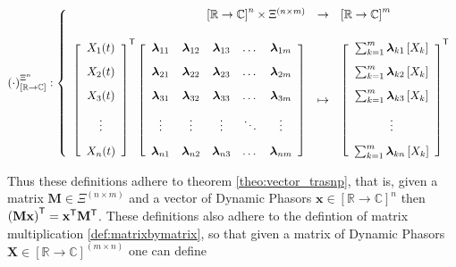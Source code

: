 \begin{equation} %
\left(\cdot\right)^{\Xi^n}_{\left[\mathbb{R}\to\mathbb{C}\right]}:
%
\left\{\begin{array}{rcl}
	\left[\mathbb{R}\to\mathbb{C}\right]^n \times \Xi^{\left(n\times m\right)} &\to& \left[\mathbb{R}\to\mathbb{C}\right]^m \\[5mm]
%
\left[\begin{array}{c} X_1(t) \\[3mm] X_2(t) \\[3mm] X_3(t) \\[3mm] \vdots \\[3mm] X_n(t) \end{array}\right]^\transpose 
\left[\begin{array}{ccccc} 
	\dpL_{11} & \dpL_{12} & \dpL_{13} & \dots  & \dpL_{1m} \\[3mm]
	\dpL_{21} & \dpL_{22} & \dpL_{23} & \dots  & \dpL_{2m} \\[3mm]
	\dpL_{31} & \dpL_{32} & \dpL_{33} & \dots  & \dpL_{3m} \\[3mm]
	\vdots    & \vdots    & \vdots    & \ddots & \vdots    \\[3mm]
	\dpL_{n1} & \dpL_{n2} & \dpL_{n3} & \dots  & \dpL_{nm}
\end{array}\right]& \mapsto &
%
\left[\begin{array}{c}
\sum_{k=1}^m \dpL_{k1}\left[X_k\right] \\[3mm]
\sum_{k=1}^m \dpL_{k2}\left[X_k\right] \\[3mm]
\sum_{k=1}^m \dpL_{k3}\left[X_k\right] \\[3mm]
\vdots                                 \\[3mm]
\sum_{k=1}^m \dpL_{kn}\left[X_k\right]
\end{array}\right]^\transpose
\end{array}\right. \label{eq:dpvec_by_matrix_def}
\end{equation} %

	Thus these definitions adhere to theorem \ref{theo:vector_trasnp}, that is, given a matrix $\mathbf{M}\in\Xi^{(n\times m)}$ and a vector of Dynamic Phasors $\mathbf{x}\in\left[\mathbb{R}\to\mathbb{C}\right]^n$ then $\left(\mathbf{Mx}\right)^{\mathsf{T}} = \mathbf{x}^{\mathsf{T}}\mathbf{M}^{\mathsf{T}}$. These definitions also adhere to the defintion of matrix multiplication \ref{def:matrixbymatrix}, so that given a matrix of Dynamic Phasors $\mathbf{X}\in\left[\mathbb{R}\to\mathbb{C}\right]^{(m\times n)}$ one can define

